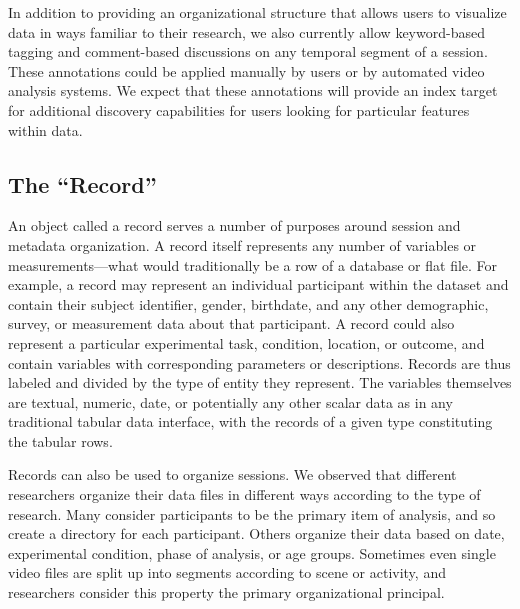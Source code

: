 \documentclass{sig-alternate}
\begin{document}
In addition to providing an organizational structure that allows users to visualize data in ways familiar to their research, we also currently allow keyword-based tagging and comment-based discussions on any temporal segment of a session.
These annotations could be applied manually by users or by automated video analysis systems.
We expect that these annotations will provide an index target for additional discovery capabilities for users looking for particular features within data.


\subsection{The ``Record''}

An object called a record serves a number of purposes around session and metadata organization. 
A record itself represents any number of variables or measurements---what would traditionally be a row of a database or flat file.
For example, a record may represent an individual participant within the dataset and contain their subject identifier, gender, birthdate, and any other demographic, survey, or measurement data about that participant.
A record could also represent a particular experimental task, condition, location, or outcome, and contain variables with corresponding parameters or descriptions.
Records are thus labeled and divided by the type of entity they represent.
The variables themselves are textual, numeric, date, or potentially any other scalar data as in any traditional tabular data interface, with the records of a given type constituting the tabular rows.

Records can also be used to organize sessions.
We observed that different researchers organize their data files in different ways according to the type of research.
Many consider participants to be the primary item of analysis, and so create a directory for each participant.
Others organize their data based on date, experimental condition, phase of analysis, or age groups.
Sometimes even single video files are split up into segments according to scene or activity, and researchers consider this property the primary organizational principal.
\end{document}
